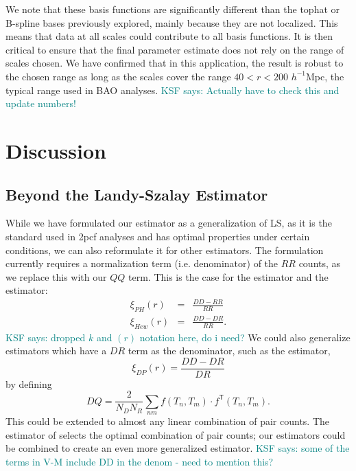 \documentclass[modern]{aastex62}
\newcommand{\cf}{2pcf\xspace} %
\newcommand{\LS}{LS\xspace}
\newcommand{\T}{^{\mathsf{T}}}
\newcommand{\hmpc}{$h^{-1}$Mpc}
\newcommand{\KSF}[1]{\textcolor{teal}{KSF says: #1}}
\begin{document}
We note that these basis functions are significantly different than the tophat or B-spline bases previously explored, mainly because they are not localized.
This means that data at all scales could contribute to all basis functions.
It is then critical to ensure that the final parameter estimate does not rely on the range of scales chosen.
We have confirmed that in this application, the result is robust to the chosen range as long as the scales cover the range $40<r<200$ \hmpc, the typical range used in BAO analyses. \KSF{Actually have to check this and update numbers!}




\section{Discussion} \label{sec:discuss}

\subsection{Beyond the Landy-Szalay Estimator}

While we have formulated our estimator as a generalization of \LS, as it is the standard used in \cf analyses and has optimal properties under certain conditions, we can also reformulate it for other estimators.
The formulation currently requires a normalization term (i.e. denominator) of the $RR$ counts, as we replace this with our $QQ$ term.
This is the case for the \cite{PeeblesHauser1974} estimator and the \cite{Hewett1982} estimator:
\begin{eqnarray}
    \xi_{PH}(r) &=& \frac{DD - RR}{RR} \\
    \xi_{Hew}(r) &=& \frac{DD - DR}{RR}.
\end{eqnarray}
\KSF{dropped $k$ and $(r)$ notation here, do i need?}
We could also generalize estimators which have a $DR$ term as the denominator, such as the \cite{DavisPeebles1983} estimator,
\begin{equation}
    \xi_{DP}(r) = \frac{DD - DR}{DR}
\end{equation}
by defining
\begin{equation}
    DQ = \frac{2}{N_D N_R} \sum_{n m} f(T_n, T_m) \cdot f\T(T_n, T_m).
\end{equation}
This could be extended to almost any linear combination of pair counts.
The estimator of \cite{VargasMagana2013} selects the optimal combination of pair counts; our estimators could be combined to create an even more generalized estimator.
\KSF{some of the terms in V-M include DD in the denom - need to mention this?}
\end{document}
